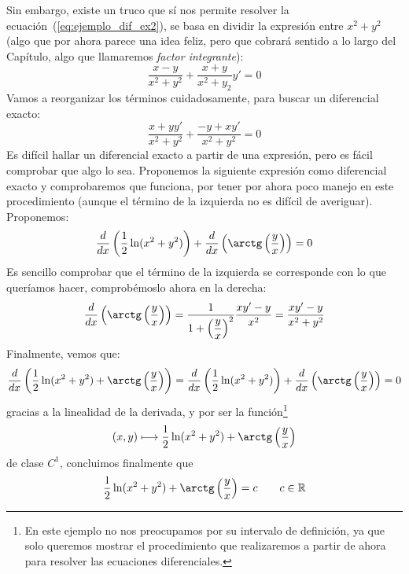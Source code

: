 \begin{ejemplo}
    Sin embargo, existe un truco que sí nos permite resolver la ecuación~(\ref{eq:ejemplo_dif_ex2}), se basa en dividir la expresión entre $x^2+y^2$ (algo que por ahora parece una idea feliz, pero que cobrará sentido a lo largo del Capítulo, algo que llamaremos \textit{factor integrante}):
    \begin{equation*}
        \dfrac{x-y}{x^2+y^2} + \dfrac{x+y}{x^2+y_2}y' = 0
    \end{equation*}
    Vamos a reorganizar los términos cuidadosamente, para buscar un diferencial exacto:
    \begin{equation*}
        \dfrac{x+yy'}{x^2+y^2} + \dfrac{-y+xy'}{x^2+y^2} = 0
    \end{equation*}
    Es difícil hallar un diferencial exacto a partir de una expresión, pero es fácil comprobar que algo lo sea. Proponemos la siguiente expresión como diferencial exacto y comprobaremos que funciona, por tener por ahora poco manejo en este procedimiento (aunque el término de la izquierda no es difícil de averiguar). Proponemos:
    \begin{equation*}
        \dfrac{d}{dx}\left(\dfrac{1}{2}\ln(x^2+y^2)\right) + \dfrac{d}{dx}\left(\arctg\left(\dfrac{y}{x}\right)\right) = 0
    \end{equation*}
    Es sencillo comprobar que el término de la izquierda se corresponde con lo que queríamos hacer, comprobémoslo ahora en la derecha:
    \begin{equation*}
        \dfrac{d}{dx}\left(\arctg\left(\dfrac{y}{x}\right)\right) = \dfrac{1}{1+{\left(\dfrac{y}{x}\right)}^{2}} \dfrac{xy'-y}{x^2} = \dfrac{xy'-y}{x^2+y^2}
    \end{equation*}
    Finalmente, vemos que:
    \begin{equation*}
        \dfrac{d}{dx}\left(\dfrac{1}{2}\ln(x^2+y^2)+\arctg\left(\dfrac{y}{x}\right)\right) = \dfrac{d}{dx}\left(\dfrac{1}{2}\ln(x^2+y^2)\right) + \dfrac{d}{dx}\left(\arctg\left(\dfrac{y}{x}\right)\right) = 0
    \end{equation*}
    gracias a la linealidad de la derivada, y por ser la función\footnote{En este ejemplo no nos preocupamos por su intervalo de definición, ya que solo queremos mostrar el procedimiento que realizaremos a partir de ahora para resolver las ecuaciones diferenciales.}
    \begin{equation*}
        (x,y) \longmapsto \dfrac{1}{2}\ln(x^2+y^2) + \arctg\left(\dfrac{y}{x}\right)
    \end{equation*}
    de clase $C^1$, concluimos finalmente que
    \begin{equation*}
        \dfrac{1}{2}\ln(x^2+y^2) + \arctg\left(\dfrac{y}{x}\right) = c \qquad c\in \mathbb{R}
    \end{equation*}
\end{ejemplo}
